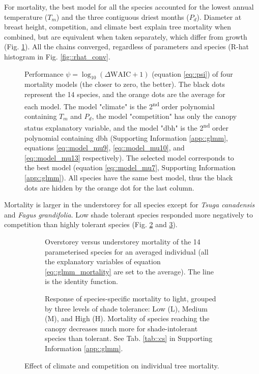 For mortality, the best model for all the species accounted for the lowest annual temperature ($ T_m $) and the three contiguous driest months ($ P_d $). Diameter at breast height, competition, and climate best explain tree mortality when combined, but are equivalent when taken separately, which differ from growth (Fig. \ref{fig::delta_waic}). All the chains converged, regardless of parameters and species (R-hat histogram in Fig. \ref{fig::rhat_conv}. 
\begin{figure}
	\centering
	
	\caption{Performance $ \psi = \log_{10}(\Delta \text{WAIC} + 1) $ (equation \ref{eq::psi}) of four mortality models (the closer to zero, the better). The black dots represent the 14 species, and the orange dots are the average for each model. The model "climate" is the 2\textsuperscript{nd} order polynomial containing $ T_m $ and $ P_d $, the model "competition" has only the canopy status explanatory variable, and the model "dbh" is the 2\textsuperscript{nd} order polynomial containing dbh (Supporting Information \ref{app::glmm}, equations \eqref{eq::model_mu9}, \eqref{eq::model_mu10}, and \eqref{eq::model_mu13} respectively). The selected model corresponds to the best model (equation \eqref{eq::model_mu7}, Supporting Information \ref{app::glmm}). All species have the same best model, thus the black dots are hidden by the orange dot for the last column. \label{fig::delta_waic}}
\end{figure}
Mortality is larger in the understorey for all species except for \textit{Tsuga canadensis} and \textit{Fagus grandifolia}. Low shade tolerant species responded more negatively to competition than highly tolerant species (Fig. \ref{fig::over_under_mu} and \ref{fig::groups_mu}).
\begin{figure}
\begin{subfigure}[t]{.48\textwidth}
	\centering
	
	\caption{Overstorey versus understorey mortality of the 14 parameterised species for an averaged individual (\ie all the explanatory variables of equation \eqref{eq::glmm_mortality} are set to the average). The line is the identity function.}
	\label{fig::over_under_mu}
\end{subfigure}
\hfill
\begin{subfigure}[t]{.48\textwidth}
	\centering
	
	\caption{Response of species-specific mortality to light, grouped by three levels of shade tolerance: Low (L), Medium (M), and High (H). Mortality of species reaching the canopy decreases much more for shade-intolerant species than tolerant. See Tab. \ref{tab::cs} in Supporting Information \ref{app::glmm}.}
	\label{fig::groups_mu}
\end{subfigure}
\caption{Effect of climate and competition on individual tree mortality.}
\label{fig::mortalityResults}
\end{figure}

